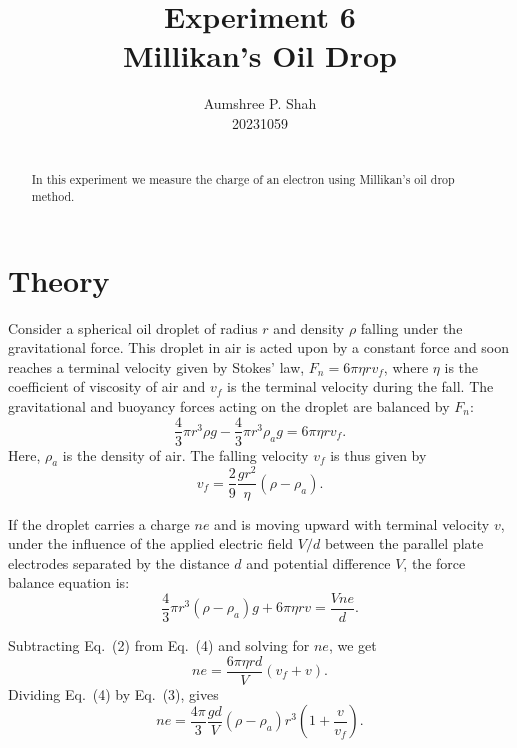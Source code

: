 \documentclass[%
sor,
 jor,
 amsmath,amssymb,
 reprint,%
]{revtex4-2}
\begin{document}

\title{Experiment 6\\Millikan's Oil Drop}

\author{Aumshree P. Shah\\20231059\color{red}}
\altaffiliation[\color{red}]{aumshree.pinkalbenshah@students.iiserpune.ac.in}
\date{$\,\,\,\,\,\,\,\,\,\,\,\,\,\,\,\,\,\,\,\,\,\,\,\,\,\,\,\,\,\,\,\,\,\,\,\,\,\,\,\,$}
\vspace{1cm}
\begin{abstract}
\centering
In this experiment we measure the charge of an electron using Millikan's oil drop method.
\end{abstract}
\maketitle
\section{Theory}

Consider a spherical oil droplet of radius $r$ and density $\rho$ falling under the gravitational force. This droplet in air is acted upon by a constant force and soon reaches a terminal velocity given by Stokes' law,
$    F_n = 6 \pi \eta r v_f$, 
where $\eta$ is the coefficient of viscosity of air and $v_f$ is the terminal velocity during the fall. The gravitational and buoyancy forces acting on the droplet are balanced by $F_n$:
\begin{equation}
    \frac{4}{3} \pi r^3 \rho g - \frac{4}{3} \pi r^3 \rho_a g = 6 \pi \eta r v_f.
\end{equation}
Here, $\rho_a$ is the density of air. The falling velocity $v_f$ is thus given by
\begin{equation}
    v_f = \frac{2}{9} \frac{g r^2}{\eta} (\rho - \rho_a).
\end{equation}

If the droplet carries a charge $ne$ and is moving upward with terminal velocity $v$, under the influence of the applied electric field $V/d$ between the parallel plate electrodes separated by the distance $d$ and potential difference $V$, the force balance equation is:
\begin{equation}
    \frac{4}{3} \pi r^3 (\rho - \rho_a) g + 6 \pi \eta r v = \frac{Vne}{d}.
\end{equation}

Subtracting Eq.~(2) from Eq.~(4) and solving for $ne$, we get
\begin{equation}
    ne = \frac{6 \pi \eta r d}{V} (v_f + v).
\end{equation}
Dividing Eq.~(4) by Eq.~(3), gives
\begin{equation}
    ne = \frac{4 \pi}{3} \frac{g d}{V} (\rho - \rho_a) r^3 \left( 1 + \frac{v}{v_f} \right).
\end{equation}
\end{document}
